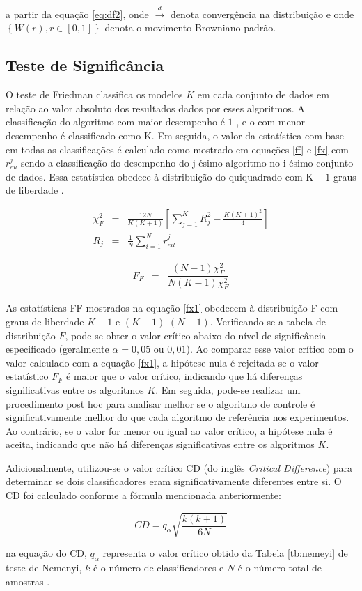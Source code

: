 \noindent a partir da equação \eqref{eq:df2}, onde $\stackrel{d}{\longrightarrow}$ denota convergência na distribuição e onde $\left\{W(r), r \in[0,1]\right\}$ denota o movimento Browniano padrão.

\subsection{Teste de Signific\^ancia}


O teste de Friedman classifica os modelos $K$ em cada conjunto de dados em relação ao valor absoluto dos resultados dados por esses algoritmos. A classificação do algoritmo com maior desempenho é $1$ , e o com menor desempenho é classificado como $\mathrm{K}$. Em seguida, o valor da estatística com base em todas as classificações é calculado como mostrado em equações \eqref{ff} e \eqref{fx} com $r_{e u}^j$ sendo a classificação do desempenho do j-ésimo algoritmo no i-ésimo conjunto de dados. Essa estatística obedece à distribuição do quiquadrado com $\mathrm{K}-1$ graus de liberdade \cite{Liu2022}.

\begin{eqnarray}
	\chi_F^2 & =&\frac{12 N}{K(K+1)}\left[\sum_{j=1}^K R_j^2-\frac{K(K+1)^2}{4}\right] \label{ff}\\
	R_j & =&\frac{1}{N} \sum_{i=1}^N r_{e i l}^j \label{fx}
\end{eqnarray}



\begin{eqnarray}
	F_F&=&\dfrac{(N-1) \chi_F^2}{N(K-1) \chi_F^2}\label{fx1}
\end{eqnarray}

As estatísticas FF mostrados na equação \eqref{fx1} obedecem à distribuição F com graus de liberdade $K-1$ e $(K-1)$ $(N-1)$. Verificando-se a tabela de distribuição $F$, pode-se obter o valor crítico abaixo do nível de significância especificado (geralmente $\alpha = 0,05$ ou $0,01$). Ao comparar esse valor crítico com o valor calculado com a equação \eqref{fx1}, a hipótese nula é rejeitada se o valor estatístico $F_F$ é maior que o valor crítico, indicando que há diferenças significativas entre os algoritmos $K$. Em seguida, pode-se realizar um procedimento post hoc para analisar melhor se o algoritmo de controle é significativamente melhor do que cada algoritmo de referência nos experimentos. Ao contrário, se o valor for menor ou igual ao valor crítico, a hipótese nula é aceita, indicando que não há diferenças significativas entre os algoritmos $K$.


Adicionalmente, utilizou-se o valor crítico CD (do inglês \textit{Critical Difference}) para determinar se dois classificadores eram significativamente diferentes entre si. O CD foi calculado conforme a fórmula mencionada anteriormente:

\begin{equation}
	CD = q_\alpha \sqrt{\frac{k(k+1)}{6N}}
\end{equation}

\noindent na equação do CD, $q_\alpha$ representa o valor crítico obtido da Tabela \ref{tb:nemeyi} de teste de Nemenyi, $k$ é o número de classificadores e $N$ é o número total de amostras \cite{Liu2022}.

